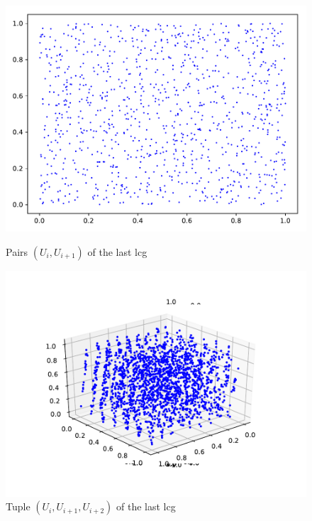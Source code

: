 \documentclass[11pt,a4paper]{article}
\begin{document}
\begin{figure}[ht]
	\centering
	\begin{minipage}{0.45\textwidth}
		\centering
		\includegraphics[width=\textwidth]{es5_a}
		\caption{Pairs $(U_i, U_{i+1})$ of the last \gls{lcg}}
		\label{fig:es5_a}
	\end{minipage}
	\begin{minipage}{0.45\textwidth}
		\centering
		\includegraphics[width=\textwidth]{es5_b}
		\caption{Tuple $(U_i, U_{i+1}, U_{i+2})$ of the last \gls{lcg}}
    \label{fig:es5_b}
	\end{minipage}
\end{figure}
\end{document}
